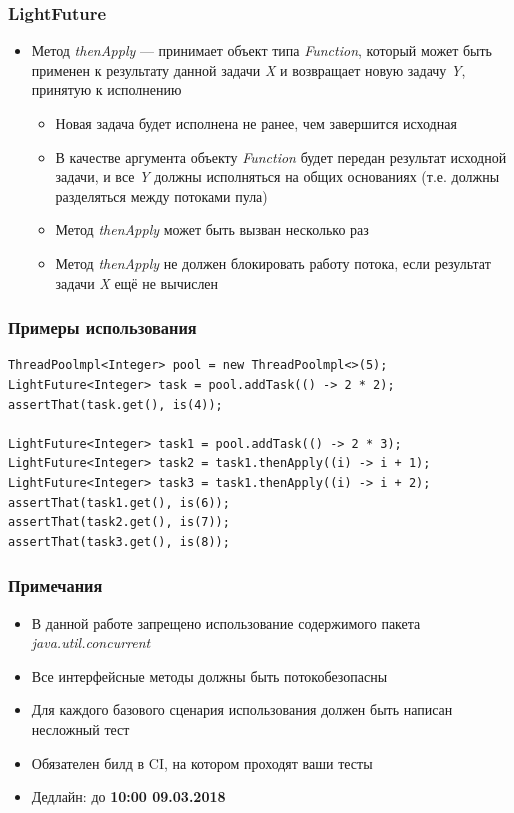 \documentclass[xetex,mathserif,serif]{beamer}
\begin{document}
	\begin{frame}
		\frametitle{LightFuture}
		\begin{itemize}
			\item Метод \textit{thenApply} --- принимает объект типа \textit{Function}, который может быть применен к результату данной задачи \textit{X} и возвращает новую задачу \textit{Y}, принятую к исполнению
			\begin{itemize}
				\item Новая задача будет исполнена не ранее, чем завершится исходная
				\item В качестве аргумента объекту \textit{Function} будет передан результат исходной задачи, и все \textit{Y} должны исполняться на общих основаниях (т.е. должны разделяться между потоками пула)
				\item Метод \textit{thenApply} может быть вызван несколько раз
				\item Метод \textit{thenApply} не должен блокировать работу потока, если результат задачи \textit{X} ещё не вычислен
			\end{itemize}
		\end{itemize}
	\end{frame}

	\begin{frame}[fragile]
		\frametitle{Примеры использования}
		\begin{footnotesize}
			\begin{verbatim}
ThreadPoolmpl<Integer> pool = new ThreadPoolmpl<>(5);
LightFuture<Integer> task = pool.addTask(() -> 2 * 2);
assertThat(task.get(), is(4));

LightFuture<Integer> task1 = pool.addTask(() -> 2 * 3);
LightFuture<Integer> task2 = task1.thenApply((i) -> i + 1);
LightFuture<Integer> task3 = task1.thenApply((i) -> i + 2);
assertThat(task1.get(), is(6));
assertThat(task2.get(), is(7));
assertThat(task3.get(), is(8));
			\end{verbatim}
		\end{footnotesize}
	\end{frame}

	\begin{frame}
		\frametitle{Примечания}
		\begin{itemize}
			\item В данной работе запрещено использование содержимого пакета \textit{java.util.concurrent}
			\item Все интерфейсные методы должны быть потокобезопасны
			\item Для каждого базового сценария использования должен быть написан несложный тест
			\item Обязателен билд в CI, на котором проходят ваши тесты
			\item Дедлайн: до \textbf{10:00 09.03.2018}
		\end{itemize}
	\end{frame}
\end{document}
